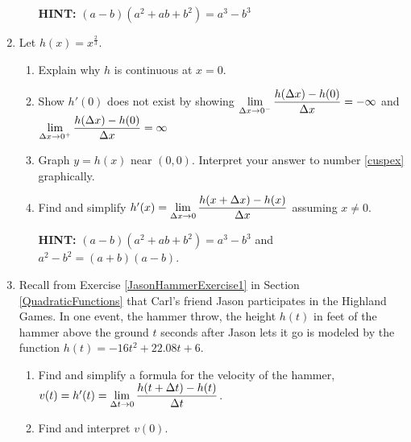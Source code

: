 \documentclass{ximera}
\begin{document}
\begin{enumerate}
\begin{enumerate}
\smallskip

\textbf{HINT:}  $(a-b)\left(a^2+ab+b^2\right) = a^3 - b^3$ 
        
\smallskip

\end{enumerate}

\item Let  $h(x) = x^{\frac{2}{3}}$.  

\begin{enumerate}

\item Explain why $h$ is continuous at $x = 0$.

\item\label{cuspex} Show $h'(0)$ does not exist by showing $\ds{\lim_{\Delta x \rightarrow 0^{-}} \dfrac{h(\Delta x) - h(0)}{\Delta x} = -\infty}$ and $\ds{\lim_{\Delta x \rightarrow 0^{+}} \dfrac{h(\Delta x) - h(0)}{\Delta x} = \infty}$

\smallskip
        
\item  Graph $y = h(x)$ near $(0,0)$.  Interpret your answer to number \ref{cuspex} graphically.

\smallskip

\item  Find and simplify  $h'(x) =  \ds{\lim_{\Delta x \rightarrow 0} \dfrac{h(x+\Delta x) - h(x)}{\Delta x}}$ assuming $x \neq 0$.

\smallskip

\textbf{HINT:}  $(a-b)\left(a^2+ab+b^2\right) = a^3 - b^3$ and $a^2 - b^2 = (a+b)(a-b)$.
        
\smallskip

\end{enumerate}

\item  Recall from Exercise \ref{JasonHammerExercise1} in Section \ref{QuadraticFunctions} that Carl's friend Jason participates in the Highland Games. In one event, the hammer throw, the height $h(t)$ in feet of the hammer above the ground $t$ seconds after Jason lets it go is modeled by the function $h(t) = -16t^2 +  22.08t + 6$. 

\begin{enumerate}

\item  Find and simplify a formula for the velocity of the hammer, $v(t) = h'(t) = \ds{\lim_{\Delta t \rightarrow 0} \dfrac{h(t + \Delta t) - h(t)}{\Delta t}}$.

\item  Find and interpret $v(0)$.


\end{enumerate}
\end{enumerate}
\end{document}
